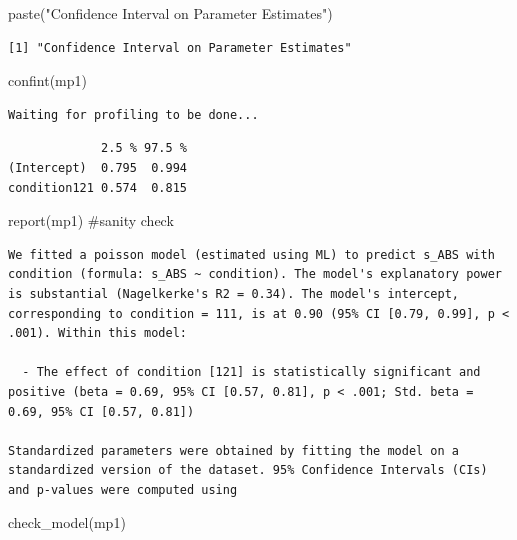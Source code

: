\documentclass[
  letterpaper,
  DIV=11,
  numbers=noendperiod]{scrreprt}
\newenvironment{Shaded}{\begin{snugshade}}{\end{snugshade}}
\newcommand{\CommentTok}[1]{\textcolor[rgb]{0.37,0.37,0.37}{#1}}
\newcommand{\FunctionTok}[1]{\textcolor[rgb]{0.28,0.35,0.67}{#1}}
\newcommand{\NormalTok}[1]{\textcolor[rgb]{0.00,0.23,0.31}{#1}}
\newcommand{\StringTok}[1]{\textcolor[rgb]{0.13,0.47,0.30}{#1}}
\begin{document}
\begin{Shaded}
\begin{Highlighting}[]
\FunctionTok{paste}\NormalTok{(}\StringTok{"Confidence Interval on Parameter Estimates"}\NormalTok{)}
\end{Highlighting}
\end{Shaded}

\begin{verbatim}
[1] "Confidence Interval on Parameter Estimates"
\end{verbatim}

\begin{Shaded}
\begin{Highlighting}[]
\FunctionTok{confint}\NormalTok{(mp1)}
\end{Highlighting}
\end{Shaded}

\begin{verbatim}
Waiting for profiling to be done...
\end{verbatim}

\begin{verbatim}
             2.5 % 97.5 %
(Intercept)  0.795  0.994
condition121 0.574  0.815
\end{verbatim}

\begin{Shaded}
\begin{Highlighting}[]
\FunctionTok{report}\NormalTok{(mp1) }\CommentTok{\#sanity check}
\end{Highlighting}
\end{Shaded}

\begin{verbatim}
We fitted a poisson model (estimated using ML) to predict s_ABS with condition (formula: s_ABS ~ condition). The model's explanatory power is substantial (Nagelkerke's R2 = 0.34). The model's intercept, corresponding to condition = 111, is at 0.90 (95% CI [0.79, 0.99], p < .001). Within this model:

  - The effect of condition [121] is statistically significant and positive (beta = 0.69, 95% CI [0.57, 0.81], p < .001; Std. beta = 0.69, 95% CI [0.57, 0.81])

Standardized parameters were obtained by fitting the model on a standardized version of the dataset. 95% Confidence Intervals (CIs) and p-values were computed using 
\end{verbatim}

\begin{Shaded}
\begin{Highlighting}[]
\FunctionTok{check\_model}\NormalTok{(mp1)}
\end{Highlighting}
\end{Shaded}
\end{document}
